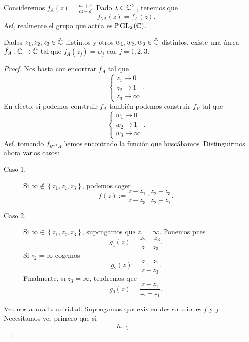 \begin{observation}
Consideremos $\displaystyle f_{A}\left(z\right)=\frac{az + b}{cz + d} $. Dado $\displaystyle \lambda \in \mathbb{C}^{\times} $, tenemos que 
\[f_{\lambda A}\left(z\right)= f_{A}\left(z\right) .\]
Así, realmente el grupo que actúa es $\displaystyle \mathbb{P}\operatorname{GL}_{2}\left(\mathbb{C}\right)$. 
\end{observation}
\begin{theorem}
Dados $\displaystyle z_{1}, z_{2}, z_{3} \in \hat{\mathbb{C}} $ distintos y otros $\displaystyle w_{1}, w_{2}, w_{3} \in \hat{\mathbb{C}} $ distintos, existe una única $\displaystyle \hat{f}_{A} : \hat{\mathbb{C}} \to \hat{\mathbb{C}} $ tal que $\displaystyle f_{A}\left(z_{j}\right)=w_{j} $ con $\displaystyle j = 1, 2, 3 $.
\end{theorem}
\begin{proof}
Nos basta con encontrar $\displaystyle f_{A} $ tal que 
\[
\begin{cases}
z_{1} \to 0 \\
z_{2} \to 1 \\
z_{3} \to \infty
\end{cases}
.\]
En efecto, si podemos construir $\displaystyle f_{A} $ también podemos construir $\displaystyle f_{B} $ tal que 
\[
\begin{cases}
w_{1} \to 0 \\
w_{2} \to 1 \\
w_{3} \to \infty
\end{cases}
.\]
Así, tomando $\displaystyle f_{B^{-1}A} $ hemos encontrado la función que buscábamos. Distinguirmos ahora varios casos:
\begin{description}
	\item[Caso 1.] Si $\displaystyle \infty \not\in \left\{ z_{1}, z_{2}, z_{3}\right\}  $, podemos coger
		\[f\left(z\right):= \frac{z - z_{1}}{z-z_{3}} \cdot \frac{z_{2}-z_{3}}{z_{2}-z_{1}} .\]
	\item[Caso 2.] Si $\displaystyle \infty \in \left\{ z_{1}, z_{2}, z_{3}\right\}  $, supongamos que $\displaystyle z_{1}= \infty $. Ponemos pues
		\[g_{1}\left(z\right)=\frac{z_{2}-z_{3}}{z-z_{3}} .\]
		Si $\displaystyle z_{2}=\infty $ cogemos 
		\[g_{2}\left(z\right)=\frac{z-z_{1}}{z-z_{3}} .\]
	Finalmente, si $\displaystyle z _{3}= \infty $, tendremos que 
	\[g_{3}\left(z\right)=\frac{z-z_{1}}{z_{2}-z_{1}} .\]
\end{description}
Veamos ahora la unicidad. Supongamos que existen dos soluciones $\displaystyle f $ y $\displaystyle g $. Necesitamos ver primero que si 
\[h : 
\begin{cases}

\end{cases}\]
\end{proof}
